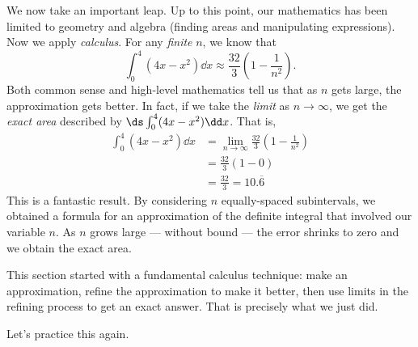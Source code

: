 We now take an important leap. Up to this point, our mathematics has been limited to geometry and algebra (finding areas and manipulating expressions). Now we apply \emph{calculus}. For any \emph{finite} $n$, we know that
\[\int_0^4 (4x-x^2)\dd x \approx \frac{32}{3}\left(1-\frac{1}{n^2}\right).\]
Both common sense and high-level mathematics tell us that as $n$ gets large, the approximation gets better. In fact, if we take the \emph{limit} as $n\rightarrow \infty$, we get the \emph{exact area} described by $\ds\int_0^4 (4x-x^2)\dd x$. That is, 
\begin{align*}
	\int_0^4 (4x-x^2)\dd x
	&= \lim_{n\to\infty} \frac{32}{3}\left(1-\frac{1}{n^2}\right) \\
	&= \frac{32}{3}\left(1-0\right)\\
	&= \frac{32}{3} = 10.\overline{6}
\end{align*}
This is a fantastic result. By considering $n$ equally-spaced subintervals, we obtained a formula for an approximation of the definite integral that involved our variable $n$. As $n$ grows large --- without bound --- the error shrinks to zero and we obtain the exact area.

This section started with a fundamental calculus technique: make an approximation, refine the approximation to make it better, then use limits in the refining process to get an exact answer. That is precisely what we just did.

Let's practice this again.


